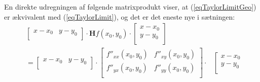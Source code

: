 \begin{bevis}
En direkte udregningen af følgende matrixprodukt viser, at (\ref{eqTaylorLimitGeo}) er ækvivalent med
(\ref{eqTaylorLimit}), og det er det eneste nye i sætningen:
\begin{equation}
\begin{aligned}
& \left[
                                          \begin{array}{cc}
                                            x-x_{0} & y-y_{0} \\
                                          \end{array}
                                        \right] \cdot \bm{H}f(x_{0}, y_{0})\cdot \left[
                                                                                   \begin{array}{c}
                                                                                         x-x_{0}  \\
                                                                                         y-y_{0}  \\
                                                                                   \end{array}
                                                                                 \right] \\
& = \left[
                                          \begin{array}{cc}
                                            x-x_{0} & y-y_{0} \\
                                          \end{array}
                                        \right] \cdot  \left[
                              \begin{array}{cc}
                                f''_{xx}(x_{0}, y_{0}) & f''_{xy}(x_{0}, y_{0}) \\
                                f''_{yx}(x_{0}, y_{0}) & f''_{yy}(x_{0}, y_{0}) \\
                              \end{array}
                            \right] \cdot &\left[
                                                                                   \begin{array}{c}
                                                                                         x-x_{0}  \\
                                                                                         y-y_{0}  \\

\end{array}
\end{aligned}
\end{equation}
\end{bevis}
